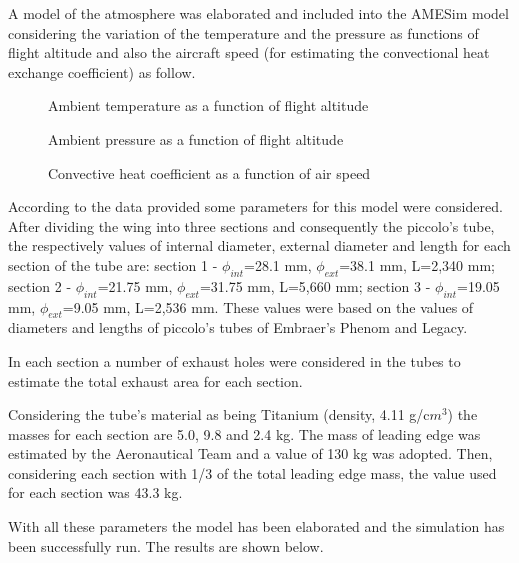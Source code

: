 A model of the atmosphere was elaborated and included into the AMESim model considering the variation of the temperature and the pressure as functions of flight altitude and also the aircraft speed (for estimating the convectional heat exchange coefficient) as follow.

\begin{figure}[H] %
    \caption{Ambient temperature as a function of flight altitude}
    \label{fig:AmbTempFuncFlAt}
\end{figure}

\begin{figure}[H] %
    \caption{Ambient pressure as a function of flight altitude}
    \label{fig:AmbPressFuncFlAt}
\end{figure}

\begin{figure}[H] %
    \caption{Convective heat coefficient as a function of air speed}
    \label{fig:ConvHeatCoeff}
\end{figure}

According to the data provided some parameters for this model were considered. After dividing the wing into three sections and consequently the piccolo's tube, the respectively values of internal diameter, external diameter and length for each section of the tube are:
section 1 - $\phi_{int}$=28.1 mm, $\phi_{ext}$=38.1 mm, L=2,340 mm; section 2 - $\phi_{int}$=21.75 mm, $\phi_{ext}$=31.75 mm, L=5,660 mm; section 3 - $\phi_{int}$=19.05 mm, $\phi_{ext}$=9.05 mm, L=2,536 mm.  These values were based on the values of diameters and lengths of piccolo's tubes of Embraer's Phenom and Legacy.

In each section a number of exhaust holes were considered in the tubes to estimate the total exhaust area for each section.

Considering the tube's material as being Titanium (density, 4.11 g/c$m^{3}$) the masses for each section are 5.0, 9.8 and 2.4 kg. The mass of leading edge was estimated by the Aeronautical Team and a value of 130 kg was adopted. Then, considering each section with 1/3 of the total leading edge mass, the value used for each section was 43.3 kg.

With all these parameters the model has been elaborated and the simulation has been successfully run. The results are shown below.

